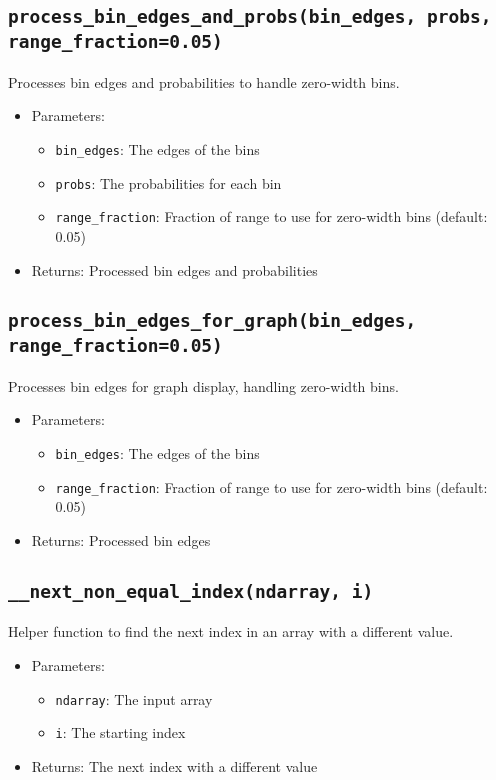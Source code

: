 \documentclass{article}
\begin{document}
\subsection{\texttt{process\_bin\_edges\_and\_probs(bin\_edges, probs, range\_fraction=0.05)}}

Processes bin edges and probabilities to handle zero-width bins.

\begin{itemize}
    \item Parameters:
    \begin{itemize}
        \item \texttt{bin\_edges}: The edges of the bins
        \item \texttt{probs}: The probabilities for each bin
        \item \texttt{range\_fraction}: Fraction of range to use for zero-width bins (default: 0.05)
    \end{itemize}
    \item Returns: Processed bin edges and probabilities
\end{itemize}

\subsection{\texttt{process\_bin\_edges\_for\_graph(bin\_edges, range\_fraction=0.05)}}

Processes bin edges for graph display, handling zero-width bins.

\begin{itemize}
    \item Parameters:
    \begin{itemize}
        \item \texttt{bin\_edges}: The edges of the bins
        \item \texttt{range\_fraction}: Fraction of range to use for zero-width bins (default: 0.05)
    \end{itemize}
    \item Returns: Processed bin edges
\end{itemize}

\subsection{\texttt{\_\_next\_non\_equal\_index(ndarray, i)}}

Helper function to find the next index in an array with a different value.

\begin{itemize}
    \item Parameters:
    \begin{itemize}
        \item \texttt{ndarray}: The input array
        \item \texttt{i}: The starting index
    \end{itemize}
    \item Returns: The next index with a different value
\end{itemize}
\end{document}
